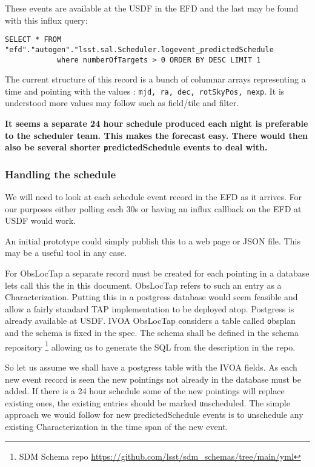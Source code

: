 These events are available at the USDF in the EFD and the last may be found with this influx query:
\begin{lstlisting}
SELECT * FROM "efd"."autogen"."lsst.sal.Scheduler.logevent_predictedSchedule
            where numberOfTargets > 0 ORDER BY DESC LIMIT 1
\end{lstlisting}

The current structure of this record is a bunch of columnar arrays representing a time and pointing with the
values : {\tt mjd, ra, dec, rotSkyPos, nexp}.
It is understood more values may follow such as field/tile and filter.


{\bf It seems a separate 24 hour schedule produced each night is preferable to the scheduler team. This makes the forecast easy. There would then also be several shorter {\texttt predictedSchedule} events to deal with. }

\subsubsection{Handling the schedule}
We will need to look at each schedule event record in the EFD as it arrives.
For our purposes either polling each 30s or having an influx callback on the EFD at USDF would
work.

An initial prototype could simply publish this to a web page or JSON file.
This may be a useful tool in any case.


For ObsLocTap a separate record must be created for each pointing in a database lets call this the \DB in this document.
ObsLocTap refers to such an entry as a {\textt Characterization}.
Putting this in a postgress database would seem feasible and allow a fairly standard TAP implementation to be deployed atop.
Postgress is already available at USDF.
IVOA ObsLocTap considers a table called {\texttt obsplan} and the schema is fixed in the spec.
The schema shall be  defined in the schema repository
\footnote{ SDM Schema repo \url{https://github.com/lsst/sdm_schemas/tree/main/yml}}
 allowing us to generate the SQL from the description in the repo.

So let us assume we shall have a postgress table with the IVOA fields.
As each new event record is seen the new pointings not already in the database must be added.
If there is a 24 hour schedule some of the new pointings will replace existing ones, the existing entries should be marked {\texttt unscheduled}.
The simple approach we would follow  for new {\texttt predictedSchedule} events is to {\texttt unschedule} any existing {\textt Characterization} in the time span of the new event.

